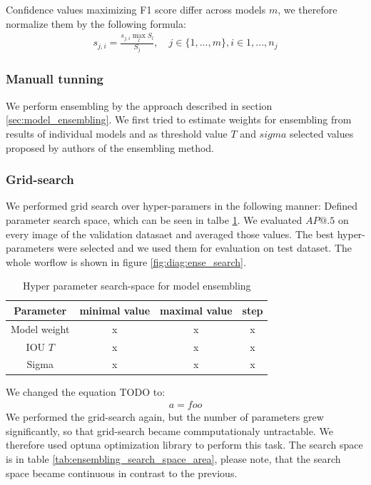 Confidence values maximizing F1 score differ across models $m$, we therefore normalize them by the following formula:
\begin{align}
    s_{j,i} = \frac{s_{j,i} \max_l S_l}{  S_j}, \quad j \in \{ 1,...,m\}, i \in {1,...,n_j}
\end{align}

\subsubsection{Manuall tunning}
We perform ensembling by the approach described in section \ref{sec:model_ensembling}. We first tried to estimate weights for ensembling from results of individual models and as threshold value $T$ and $sigma$ selected values proposed by authors of the ensembling method.

\subsubsection{Grid-search}
We performed grid search over hyper-paramers in the following manner: Defined parameter search space, which can be seen in talbe \ref{tab:ensembling_search_space}. We evaluated $AP@.5$ on every image of the validation datasaet and averaged those values. The best hyper-parameters were selected and we used them for evaluation on test dataset. The whole worflow is shown in figure \ref{fig:diag:ense_search}.

\begin{table}
    \centering
    \begin{tabular}{|c|c|c|c|}
        Parameter    & minimal value & maximal value & step \\ \hline
        Model weight & x             & x             & x    \\ \hline
        IOU $T$      & x             & x             & x    \\ \hline
        Sigma        & x             & x             & x    \\ \hline
    \end{tabular}
    \caption{Hyper parameter search-space for model ensembling}
    \label{tab:ensembling_search_space}
\end{table}

We changed the equation TODO to:
\begin{align}
    a = foo
\end{align}
We performed the grid-search again, but the number of parameters grew significantly, so that grid-search became commputationaly untractable. We therefore used optuna optimization library to perform this task. The search space is in table \ref{tab:ensembling_search_space_area}, please note, that the search space became continuous in contrast to the previous.

